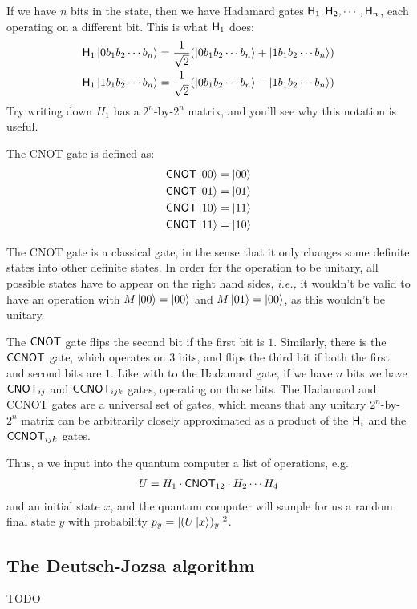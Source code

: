 \documentclass[a4paper, 11pt]{article}
\theoremstyle{definition}
\newcommand{\ie}{\textit{i.e.,}\xspace}
\begin{document}
If we have $n$ bits in the state, then we have Hadamard gates $\mathsf{H}_1, \mathsf{H}_2, \cdots, \mathsf{H}_n$, each operating on a different bit.
This is what $\mathsf{H}_1$ does:
\begin{align*}
  \mathsf{H}_1 \ket{0 b_1 b_2 \cdots b_n} = \frac{1}{\sqrt{2}}(\ket{0 b_1 b_2 \cdots b_n} + \ket{1 b_1 b_2 \cdots b_n}) \\
  \mathsf{H}_1 \ket{1 b_1 b_2 \cdots b_n} = \frac{1}{\sqrt{2}}(\ket{0 b_1 b_2 \cdots b_n} - \ket{1 b_1 b_2 \cdots b_n})
\end{align*}
Try writing down $H_1$ has a $2^n$-by-$2^n$ matrix, and you'll see why this notation is useful.

The CNOT gate is defined as:
\begin{align*}
  \mathsf{CNOT} \ket{00} = \ket{00} \\
  \mathsf{CNOT} \ket{01} = \ket{01} \\
  \mathsf{CNOT} \ket{10} = \ket{11} \\
  \mathsf{CNOT} \ket{11} = \ket{10}
\end{align*}

The CNOT gate is a classical gate, in the sense that it only changes some definite states into other definite states.
In order for the operation to be unitary, all possible states have to appear on the right hand sides, \ie it wouldn't be valid to have an operation with
$M \ket{00} = \ket{00}$ and $M \ket{01} = \ket{00}$, as this wouldn't be unitary.

The $\mathsf{CNOT}$ gate flips the second bit if the first bit is $1$.
Similarly, there is the $\mathsf{CCNOT}$ gate, which operates on $3$ bits, and flips the third bit if both the first and second bits are $1$.
Like with to the Hadamard gate, if we have $n$ bits we have $\mathsf{CNOT}_{ij}$ and $\mathsf{CCNOT}_{ijk}$ gates, operating on those bits.
The Hadamard and CCNOT gates are a universal set of gates, which means that any unitary $2^n$-by-$2^n$ matrix can be arbitrarily closely approximated as a product of the $\mathsf{H}_i$ and the $\mathsf{CCNOT}_{ijk}$ gates.

Thus, a we input into the quantum computer a list of operations, e.g.
\begin{align*}
  U = H_1 \cdot \mathsf{CNOT}_{12} \cdot H_2 \cdots H_4
\end{align*}
and an initial state $x$, and the quantum computer will sample for us a random final state $y$ with probability $p_y = |(U\ket{x})_y|^2$.

\subsection{The Deutsch-Jozsa algorithm}

TODO



\end{document}
